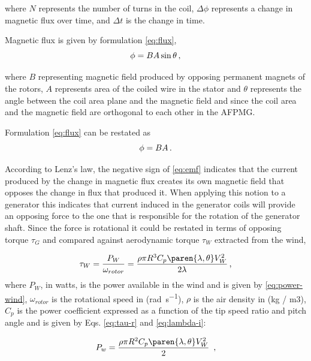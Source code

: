 \documentclass[../ewet_cwc_report.tex]{subfiles}
\begin{document}
\noindent
where $N$ represents the number of turns in the coil,
$\Delta\phi$ represents a change in magnetic flux over time,
and $\Delta t$ is the change in time.

Magnetic flux is given by formulation \eqref{eq:flux},
\begin{equation}
  \phi = BA \sin\theta
  \text{\,,}
  \label{eq:flux}
\end{equation}

\noindent
where $B$ representing magnetic field produced by opposing
permanent magnets of the rotors, $A$ represents area of the
coiled wire in the stator and $\theta$ represents the angle
between the coil area plane and the magnetic field and since
the coil area and the magnetic field are orthogonal to each
other in the AFPMG.

Formulation \eqref{eq:flux} can be restated as
\begin{equation}
  \phi = BA
  \text{\,.}
  \label{eq:flux-simple}
\end{equation}

According to Lenz's law, the negative sign of
\eqref{eq:emf} indicates that the current produced by the
change in magnetic flux creates its own magnetic field that
opposes the change in flux that produced it. When applying this
notion to a generator this indicates that current induced in the
generator coils will provide an opposing force to the one that
is responsible for the rotation of the generator shaft. Since
the force is rotational it could be restated in terms of opposing
torque $\tau_G$ and compared against aerodynamic torque
$\tau_W$ extracted from the wind,

\begin{equation}
  \tau_W = \frac{P_W}{\omega_{rotor}}
  = \frac{\rho\pi R^3 C_p\paren{\lambda, \theta} V_W^2}{2\lambda}
  \text{\,,}
  \label{eq:tau-wind}
\end{equation}
where $P_W$, in watts, is the power available in the wind and
is given by \eqref{eq:power-wind}, $\omega_{rotor}$ is the
rotational speed in (\unit{rad\per\s}), $\rho$ is the air
density in (kg / m3), $C_p$ is the power coefficient expressed
as a function of the tip speed ratio and pitch angle and is
given by Eqs. \eqref{eq:tau-r} and \eqref{eq:lambda-i}:

\begin{equation}
  P_w = \frac{\rho\pi R^2 C_p\paren{\lambda, \theta} V_W^2}{2}\
  \text{\,,}
  \label{eq:power-wind}
\end{equation}
\end{document}
